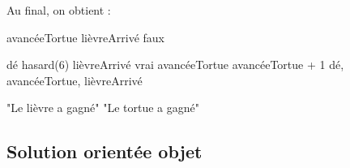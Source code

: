 \clearpage		
			Au final, on obtient :
			\begin{LDA}

					\Empty
					\Let avancéeTortue 
					\Let lièvreArrivé \Gets faux
					
					\Empty
						\Let dé \Gets hasard(6)
							\Let lièvreArrivé \Gets vrai
						\Else
							\Let avancéeTortue \Gets avancéeTortue + 1
						\EndIf
						\Write dé, avancéeTortue, lièvreArrivé
					\EndWhile

					\Empty
						\Write "Le lièvre a gagné"
					\Else
						\Write "Le tortue a gagné"
					\EndIf
				\EndAlgo
			\end{LDA}

	\subsection{Solution orientée objet}
		
